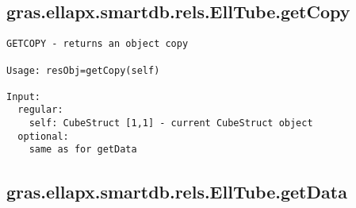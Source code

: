 \subsection{\texorpdfstring{gras.ellapx.smartdb.rels.EllTube.getCopy}{getCopy}}\label{method:gras.ellapx.smartdb.rels.EllTube.getCopy}
\begin{verbatim}
GETCOPY - returns an object copy

Usage: resObj=getCopy(self)

Input:
  regular:
    self: CubeStruct [1,1] - current CubeStruct object
  optional:
    same as for getData
\end{verbatim}
\subsection{\texorpdfstring{gras.ellapx.smartdb.rels.EllTube.getData}{getData}}\label{method:gras.ellapx.smartdb.rels.EllTube.getData}
